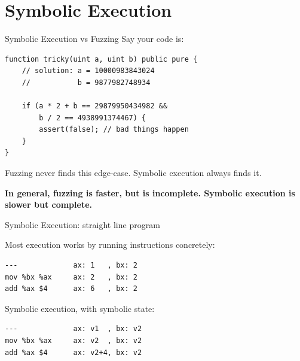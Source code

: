 \documentclass[aspectratio=169]{beamer}
\begin{document}
\section{Symbolic Execution}
\begin{frame}[fragile=singleslide]{Symbolic Execution vs Fuzzing}
Say your code is:

\begin{Verbatim}[frame=single, framerule=0.2mm, framesep=2mm,fontsize=\small]
function tricky(uint a, uint b) public pure {
	// solution: a = 10000983843024
	//           b = 9877982748934

	if (a * 2 + b == 29879950434982 &&
	    b / 2 == 4938991374467) {
		assert(false); // bad things happen
	}
}
\end{Verbatim}

Fuzzing never finds this edge-case. Symbolic execution always finds it.
\bigskip

\textbf{In general, fuzzing is faster, but is incomplete. Symbolic execution is slower but complete.}

\end{frame}



\begin{frame}[fragile=singleslide]{Symbolic Execution: straight line program}

Most execution works by running instructions concretely:
\begin{verbatim}
---             ax: 1   , bx: 2
mov %bx %ax     ax: 2   , bx: 2
add %ax $4      ax: 6   , bx: 2
\end{verbatim}
\bigskip

Symbolic execution, with symbolic state:
\begin{verbatim}
---             ax: v1  , bx: v2
mov %bx %ax     ax: v2  , bx: v2
add %ax $4      ax: v2+4, bx: v2
\end{verbatim}
\end{frame}
\end{document}
